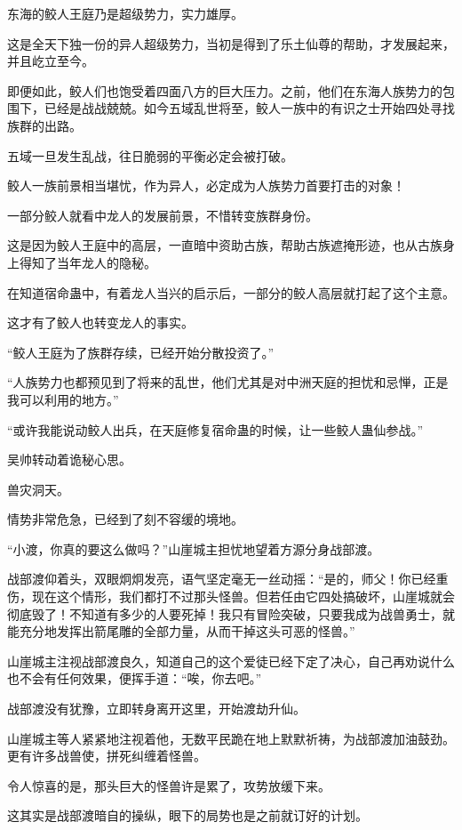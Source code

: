 \begin{this_body}
东海的鲛人王庭乃是超级势力，实力雄厚。

这是全天下独一份的异人超级势力，当初是得到了乐土仙尊的帮助，才发展起来，并且屹立至今。

即便如此，鲛人们也饱受着四面八方的巨大压力。之前，他们在东海人族势力的包围下，已经是战战兢兢。如今五域乱世将至，鲛人一族中的有识之士开始四处寻找族群的出路。

五域一旦发生乱战，往日脆弱的平衡必定会被打破。

鲛人一族前景相当堪忧，作为异人，必定成为人族势力首要打击的对象！

一部分鲛人就看中龙人的发展前景，不惜转变族群身份。

这是因为鲛人王庭中的高层，一直暗中资助古族，帮助古族遮掩形迹，也从古族身上得知了当年龙人的隐秘。

在知道宿命蛊中，有着龙人当兴的启示后，一部分的鲛人高层就打起了这个主意。

这才有了鲛人也转变龙人的事实。

“鲛人王庭为了族群存续，已经开始分散投资了。”

“人族势力也都预见到了将来的乱世，他们尤其是对中洲天庭的担忧和忌惮，正是我可以利用的地方。”

“或许我能说动鲛人出兵，在天庭修复宿命蛊的时候，让一些鲛人蛊仙参战。”

吴帅转动着诡秘心思。

兽灾洞天。

情势非常危急，已经到了刻不容缓的境地。

“小渡，你真的要这么做吗？”山崖城主担忧地望着方源分身战部渡。

战部渡仰着头，双眼炯炯发亮，语气坚定毫无一丝动摇：“是的，师父！你已经重伤，现在这个情形，我们都打不过那头怪兽。但若任由它四处搞破坏，山崖城就会彻底毁了！不知道有多少的人要死掉！我只有冒险突破，只要我成为战兽勇士，就能充分地发挥出箭尾雕的全部力量，从而干掉这头可恶的怪兽。”

山崖城主注视战部渡良久，知道自己的这个爱徒已经下定了决心，自己再劝说什么也不会有任何效果，便挥手道：“唉，你去吧。”

战部渡没有犹豫，立即转身离开这里，开始渡劫升仙。

山崖城主等人紧紧地注视着他，无数平民跪在地上默默祈祷，为战部渡加油鼓劲。更有许多战兽使，拼死纠缠着怪兽。

令人惊喜的是，那头巨大的怪兽许是累了，攻势放缓下来。

这其实是战部渡暗自的操纵，眼下的局势也是之前就订好的计划。


\end{this_body}
